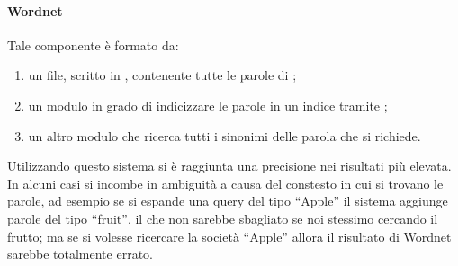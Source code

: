 \paragraph{Wordnet}
Tale componente è formato da:
\begin{enumerate}
\item un file, scritto in , contenente tutte le parole di ;
\item un modulo in grado di indicizzare le parole in un indice tramite ;
\item un altro modulo che ricerca tutti i sinonimi delle parola che si richiede.
\end{enumerate}
Utilizzando questo sistema si è raggiunta una precisione nei risultati più elevata. In alcuni casi si incombe in ambiguità a causa del constesto in cui si trovano le parole, ad esempio se si espande una query del tipo ``Apple'' il sistema aggiunge parole del tipo ``fruit'', il che non sarebbe sbagliato se noi stessimo cercando il frutto; ma se si volesse ricercare la società ``Apple'' allora il risultato di Wordnet sarebbe totalmente errato.
